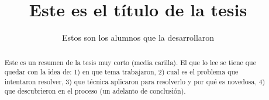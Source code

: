 \documentclass[11pt]{report}
\title{Este es el título de la tesis}
\author{Estos son los alumnos que la desarrollaron}
\begin{document}
\maketitle

\begin{abstract}
Este es un resumen de la tesis muy corto (media carilla). El que lo lee se tiene que quedar con la idea de: 1) en que tema trabajaron, 2) cual es el problema que intentaron resolver, 3) que técnica aplicaron para resolverlo y por qué es novedosa, 4) que descubrieron en el proceso (un adelanto de conclusión). 
\end{abstract}

\tableofcontents















\end{document}
